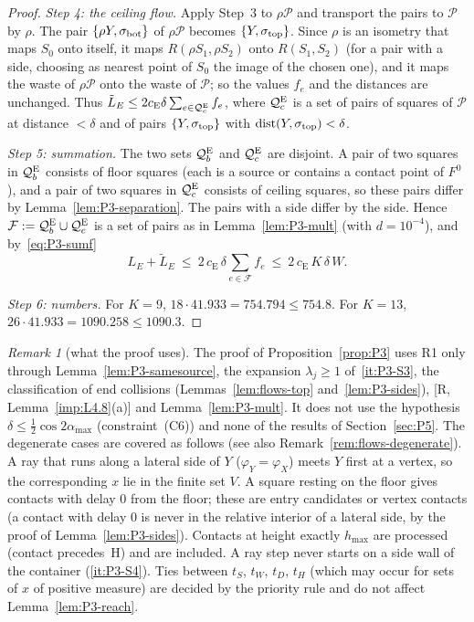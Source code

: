 \documentclass[11pt]{amsart}
\newcommand{\cP}{\mathcal P}
\newcommand{\dist}{\operatorname{dist}}
\newcommand{\amax}{\alpha_{\max}}
\newcommand{\hmax}{h_{\max}}
\newcommand{\Fz}{F^{0}}
\theoremstyle{definition}
\theoremstyle{remark}
\newtheorem{remark}[theorem]{Remark}
\numberwithin{equation}{section}
\begin{document}
\begin{proof}
\emph{Step 4: the ceiling flow.} Apply Step~3 to $\rho\cP$ and transport the pairs to $\cP$ by $\rho$. The pair $\{\rho Y,\sigma_{\rm bot}\}$ of $\rho\cP$ becomes $\{Y,\sigma_{\rm top}\}$. Since $\rho$ is an isometry that maps $S_0$ onto itself, it maps $R(\rho S_1,\rho S_2)$ onto $R(S_1,S_2)$ (for a pair with a side, choosing as nearest point of $S_0$ the image of the chosen one), and it maps the waste of $\rho\cP$ onto the waste of $\cP$; so the values $f_e$ and the distances are unchanged. Thus $\tilde L_E\le2c_{\mathrm E}\delta\sum_{e\in\mathcal Q^{\rm E}_c}f_e$, where $\mathcal Q^{\rm E}_c$ is a set of pairs of squares of $\cP$ at distance $<\delta$ and of pairs $\{Y,\sigma_{\rm top}\}$ with $\dist(Y,\sigma_{\rm top})<\delta$.

\emph{Step 5: summation.} The two sets $\mathcal Q^{\rm E}_b$ and $\mathcal Q^{\rm E}_c$ are disjoint. A pair of two squares in $\mathcal Q^{\rm E}_b$ consists of floor squares (each is a source or contains a contact point of $\Fz$), and a pair of two squares in $\mathcal Q^{\rm E}_c$ consists of ceiling squares, so these pairs differ by Lemma~\ref{lem:P3-separation}. The pairs with a side differ by the side. Hence $\mathcal F:=\mathcal Q^{\rm E}_b\cup\mathcal Q^{\rm E}_c$ is a set of pairs as in Lemma~\ref{lem:P3-mult} (with $d=10^{-4}$), and by~\eqref{eq:P3-sumf}
\[
L_E+\tilde L_E\ \le\ 2\,c_{\mathrm E}\,\delta\sum_{e\in\mathcal F}f_e\ \le\ 2\,c_{\mathrm E}\,K\,\delta\,W .
\]

\emph{Step 6: numbers.} For $K=9$, $18\cdot41.933=754.794\le754.8$. For $K=13$, $26\cdot41.933=1090.258\le1090.3$.
\end{proof}

\begin{remark}[what the proof uses]\label{rem:P3-uses}
The proof of Proposition~\ref{prop:P3} uses R1 only through Lemma~\ref{lem:P3-samesource}, the expansion $\lambda_j\ge1$ of~\ref{it:P3-S3}, the classification of end collisions (Lemmas~\ref{lem:flows-top} and~\ref{lem:P3-sides}), [R, Lemma~\ref{imp:L4.8}(a)] and Lemma~\ref{lem:P3-mult}. It does not use the hypothesis $\delta\le\frac12\cos2\amax$ (constraint~(C6)) and none of the results of Section~\ref{sec:P5}. The degenerate cases are covered as follows (see also Remark~\ref{rem:flows-degenerate}). A ray that runs along a lateral side of $Y$ ($\varphi_Y=\varphi_X$) meets $Y$ first at a vertex, so the corresponding $x$ lie in the finite set $V$. A square resting on the floor gives contacts with delay $0$ from the floor; these are entry candidates or vertex contacts (a contact with delay $0$ is never in the relative interior of a lateral side, by the proof of Lemma~\ref{lem:P3-sides}). Contacts at height exactly $\hmax$ are processed (contact precedes~H) and are included. A ray step never starts on a side wall of the container (\ref{it:P3-S4}). Ties between $t_S$, $t_W$, $t_D$, $t_H$ (which may occur for sets of $x$ of positive measure) are decided by the priority rule and do not affect Lemma~\ref{lem:P3-reach}.
\end{remark}
\end{document}
